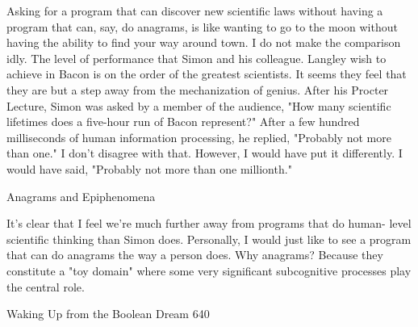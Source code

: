         Asking for a program that can discover new scientific laws without having a
program that can, say, do anagrams, is like wanting to go to the moon without having
the ability to find your way around town. I do not make the comparison idly. The
level of performance that Simon and his colleague. Langley wish to achieve in Bacon
is on the order of the greatest scientists. It seems they feel that they are but a step
away from the mechanization of genius. After his Procter Lecture, Simon was asked
by a member of the audience, "How many scientific lifetimes does a five-hour run of
Bacon represent?" After a few hundred milliseconds of human information
processing, he replied, "Probably not more than one." I don't disagree with that.
However, I would have put it differently. I would have said, "Probably not more than
one millionth."

                           Anagrams and Epiphenomena

        It's clear that I feel we're much further away from programs that do human-
level scientific thinking than Simon does. Personally, I would just like to see a
program that can do anagrams the way a person does. Why anagrams? Because they
constitute a "toy domain" where some very significant subcognitive processes play
the central role.




Waking Up from the Boolean Dream                                                    640

